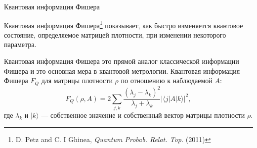 \begin{frame}{Квантовая информация Фишера}
  \begin{block}{}
    Квантовая информация Фишера\footnote[frame]{D. Petz and C. I Ghinea, \textit{Quantum Probab. Relat. Top.} (2011)}
    показывает,
    как быстро изменяется квантовое состояние,
    определяемое матрицей плотности,
    при изменении некоторого параметра.
  \end{block}
  Квантовая информация Фишера это прямой аналог классической информации Фишера и это основная мера в квантовой метрологии.
  Квантовая информация Фишера $F_Q$ для матрицы плотности $\rho$ по отношению к наблюдаемой $A$:
  $$
    F_Q \left(\rho, A \right) =
      2\sum_{j,k} \frac{\left(\lambda_j - \lambda_k \right)^2}
        {\lambda_j + \lambda_k}
      \left| \langle j|A|k \rangle \right|^2,
  $$
  где $\lambda_k$ и $|k \rangle$ --- собственное значение и собственный вектор матрицы плотности $\rho$.
\end{frame}
